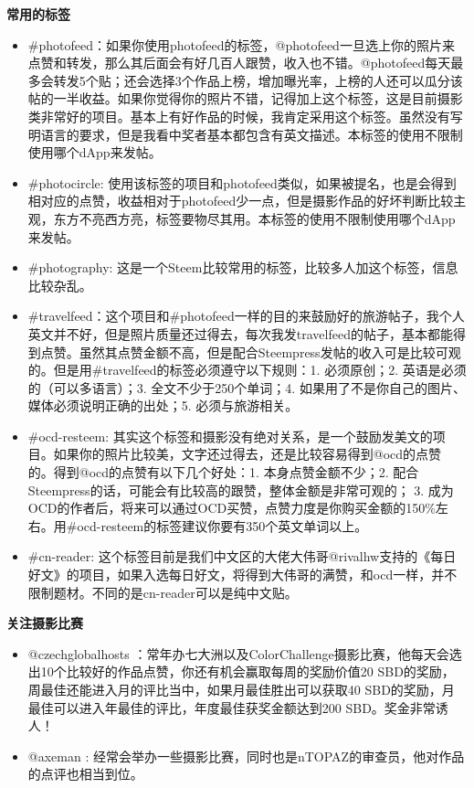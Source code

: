 \documentclass[]{ctexbook}
\begin{document}
\textbf{常用的标签}

\begin{itemize}
\item
  \#photofeed：如果你使用photofeed的标签，@photofeed一旦选上你的照片来点赞和转发，那么其后面会有好几百人跟赞，收入也不错。@photofeed每天最多会转发5个贴；还会选择3个作品上榜，增加曝光率，上榜的人还可以瓜分该帖的一半收益。如果你觉得你的照片不错，记得加上这个标签，这是目前摄影类非常好的项目。基本上有好作品的时候，我肯定采用这个标签。虽然没有写明语言的要求，但是我看中奖者基本都包含有英文描述。本标签的使用不限制使用哪个dApp来发帖。
\item
  \#photocircle: 使用该标签的项目和photofeed类似，如果被提名，也是会得到相对应的点赞，收益相对于photofeed少一点，但是摄影作品的好坏判断比较主观，东方不亮西方亮，标签要物尽其用。本标签的使用不限制使用哪个dApp来发帖。
\item
  \#photography: 这是一个Steem比较常用的标签，比较多人加这个标签，信息比较杂乱。
\item
  \#travelfeed：这个项目和\#photofeed一样的目的来鼓励好的旅游帖子，我个人英文并不好，但是照片质量还过得去，每次我发travelfeed的帖子，基本都能得到点赞。虽然其点赞金额不高，但是配合Steempress发帖的收入可是比较可观的。但是用\#travelfeed的标签必须遵守以下规则：1. 必须原创；2. 英语是必须的（可以多语言）；3. 全文不少于250个单词；4. 如果用了不是你自己的图片、媒体必须说明正确的出处；5. 必须与旅游相关。
\item
  \#ocd-resteem: 其实这个标签和摄影没有绝对关系，是一个鼓励发美文的项目。如果你的照片比较美，文字还过得去，还是比较容易得到@ocd的点赞的。得到@ocd的点赞有以下几个好处：1. 本身点赞金额不少；2. 配合Steempress的话，可能会有比较高的跟赞，整体金额是非常可观的； 3. 成为OCD的作者后，将来可以通过OCD买赞，点赞力度是你购买金额的150\%左右。用\#ocd-resteem的标签建议你要有350个英文单词以上。
\item
  \#cn-reader: 这个标签目前是我们中文区的大佬大伟哥@rivalhw支持的《每日好文》的项目，如果入选每日好文，将得到大伟哥的满赞，和ocd一样，并不限制题材。不同的是cn-reader可以是纯中文贴。
\end{itemize}

\textbf{关注摄影比赛}

\begin{itemize}
\item
  @czechglobalhosts ：常年办七大洲以及ColorChallenge摄影比赛，他每天会选出10个比较好的作品点赞，你还有机会赢取每周的奖励价值20 SBD的奖励，周最佳还能进入月的评比当中，如果月最佳胜出可以获取40 SBD的奖励，月最佳可以进入年最佳的评比，年度最佳获奖金额达到200 SBD。奖金非常诱人！
\item
  @axeman : 经常会举办一些摄影比赛，同时也是nTOPAZ的审查员，他对作品的点评也相当到位。
\end{itemize}
\end{document}
